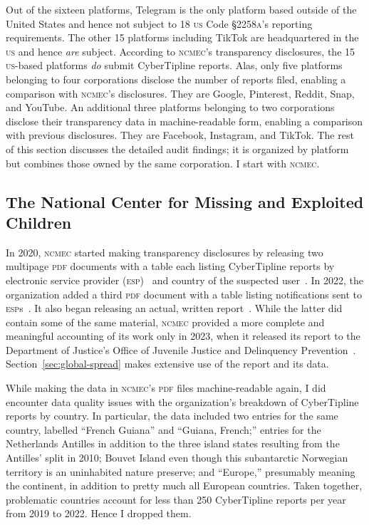 \documentclass[nonacm,screen]{acmart}
\newcommand\V[1]{\textsc{\MakeLowercase{#1}}}
\begin{document}
Out of the sixteen platforms, Telegram is the only platform based outside of the
United States and hence not subject to 18 \V{US} Code \V{\S2258A}'s reporting
requirements. The other 15 platforms including TikTok are headquartered in the
\V{US} and hence \emph{are} subject. According to \V{NCMEC}'s transparency
disclosures, the 15 \V{US}-based platforms \emph{do} submit CyberTipline
reports. Alas, only five platforms belonging to four corporations disclose the
number of reports filed, enabling a comparison with \V{NCMEC}'s disclosures.
They are Google, Pinterest, Reddit, Snap, and YouTube. An additional three
platforms belonging to two corporations disclose their transparency data in
machine-readable form, enabling a comparison with previous disclosures. They are
Facebook, Instagram, and TikTok. The rest of this section discusses the detailed
audit findings; it is organized by platform but combines those owned by the same
corporation. I start with \V{NCMEC}.


\subsection{The National Center for Missing and Exploited Children}

In 2020, \V{NCMEC} started making transparency disclosures by releasing two
multipage \V{PDF} documents with a table each listing CyberTipline reports by
electronic service provider (\V{ESP})~\cite{NcmecByPlatform2019,
NcmecByPlatform2020,NcmecByPlatform2021,NcmecByPlatform2022} and country of the
suspected user~\cite{NcmecByCountry2019,NcmecByCountry2020,NcmecByCountry2021,
NcmecByCountry2020}. In 2022, the organization added a third \V{PDF} document
with a table listing notifications sent to
\V{ESP}s~\cite{NcmecNotifications2021,NcmecNotifications2022}. It also began
releasing an actual, written
report~\cite{NcmecCyberTipline2021,NcmecCyberTipline2022}. While the latter did
contain some of the same material, \V{NCMEC} provided a more complete and
meaningful accounting of its work only in 2023, when it released its report to
the Department of Justice's Office of Juvenile Justice and Delinquency
Prevention~\cite{NCMEC2023}. Section~\ref{sec:global-spread} makes extensive use
of the report and its data.

While making the data in \V{NCMEC}'s \V{PDF} files machine-readable again, I did
encounter data quality issues with the organization's breakdown of CyberTipline
reports by country. In particular, the data included two entries for the same
country, labelled ``French Guiana'' and ``Guiana, French;'' entries for the
Netherlands Antilles in addition to the three island states resulting from the
Antilles' split in 2010; Bouvet Island even though this subantarctic Norwegian
territory is an uninhabited nature preserve; and ``Europe,'' presumably meaning
the continent, in addition to pretty much all European countries. Taken
together, problematic countries account for less than 250 CyberTipline reports
per year from 2019 to 2022. Hence I dropped them.
\end{document}
